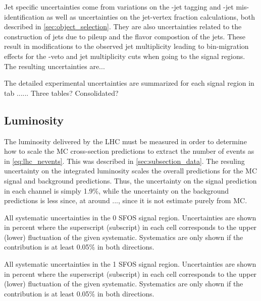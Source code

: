 Jet specific uncertainties come from variations on the \bee-jet tagging
and \bee-jet mis-identification as well as uncertainties on the jet-vertex
fraction calculations, both described in \sec\ref{sec:object_selection}. They
are also uncertainties related to the construction of jets due to pileup
and the flavor compostion of the jets. These result in modifications
to the observed jet multiplicity leading to bin-migration effects 
for the \bee-veto and jet multiplicity cuts when going to the signal regions.
The resulting uncertainties are...

The detailed experimental uncertainties are summarized for each signal 
region in tab ...... Three tables? Consolidated?

\subsection{Luminosity}
The luminosity delivered by the LHC must be measured in order to determine
how to scale the MC cross-section
predictions to extract the number of events as in \eqn\eqref{eq:lhc_nevents}.
This was described in \sec\ref{sec:subsection_data}. The resuling
uncertainty on the integrated luminosity scales the overall predictions
for the MC signal and background predictions. Thus, the uncertainty 
on the signal prediction in each channel is simply 1.9\%, while the uncertainty
on the background predictions is less since, at around ...,
since it is not estimate purely from MC.



\begin{table}[ht]
\begin{adjustwidth}{-2cm}{-2cm}

\caption{All systematic uncertainties in the 0 SFOS signal region.
Uncertainties are shown in percent where the superscript (subscript) in each cell corresponds to the upper (lower) fluctuation
of the given systematic.  Systematics are only shown if the contribution is at least 0.05\% in both directions.}
\label{tab:sys_all_0sfos}
\end{adjustwidth}
\end{table}

\begin{table}[ht]
\begin{adjustwidth}{-2cm}{-2cm}

\caption{All systematic uncertainties in the 1 SFOS signal region.
Uncertainties are shown in percent where the superscript (subscript) in each cell corresponds to the upper (lower) fluctuation
of the given systematic. 
Systematics are only shown if the contribution is at least 0.05\% in both directions.  }
\label{tab:sys_all_1sfos}
\end{adjustwidth}
\end{table}

